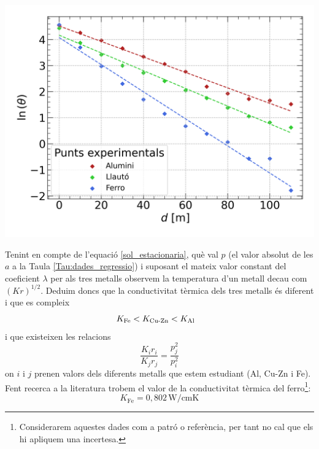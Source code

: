 \documentclass[12pt,twosides,onecolumn,openany]{article}
\newenvironment{Figura}
  {\par\medskip\noindent\minipage{\linewidth}}
  {\endminipage\par\medskip}
\begin{document}
\begin{multicols}{2}
\begin{Figura}
  \centering
  \includegraphics[width = 1\linewidth]{../../graphs/practica_Ia/plots/reg_estacionaria.png}\label{lnDeltaT_vs_d}
\end{Figura}           
Tenint en compte de l'equació \eqref{sol_estacionaria}, què val $p$ (el valor absolut de les $a$ a la Taula \ref{Tau:dades_regressio}) i suposant el mateix valor constant del coeficient $\lambda$ per als tres metalls observem la temperatura d'un metall decau com $(Kr)^{1/2}$. Deduim doncs que la conductivitat tèrmica dels tres metalls és diferent i que es compleix
\begin{equation*}
  K_{\text{Fe}} < K_{\text{Cu-Zn}} < K_{\text{Al}} \hspace{3mm}
\end{equation*}
i que existeixen les relacions
\begin{equation*}
  \frac{K_ir_i}{K_jr_j} = \frac{p^2_j}{p^2_i}
\end{equation*}
on $i$ i $j$ prenen valors dels diferents metalls que estem estudiant (Al, Cu-Zn i Fe). Fent recerca a la literatura trobem el valor de la conductivitat tèrmica del ferro\footnote{Considerarem aquestes dades com a patró o referència, per tant no cal que els hi apliquem una incertesa.}\cite{CRC}:
\begin{equation*}
  K_{\text{Fe}} =  0,802\, \text{W}/\text{cmK}
\end{equation*}

\end{multicols}
\end{document}
